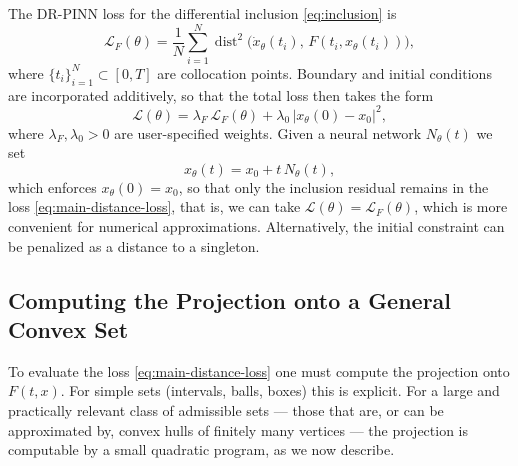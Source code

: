 \documentclass[11pt]{elsarticle}
\theoremstyle{definition}
\theoremstyle{remark}
\numberwithin{equation}{section}
\def\dist{\operatorname{dist}}
\begin{document}
	The DR-PINN loss for the differential inclusion \eqref{eq:inclusion} is
	\begin{equation}\label{eq:main-distance-loss}
		\mathcal{L}_F(\theta)
		=
		\frac{1}{N}\sum_{i=1}^{N}
		\dist^2\bigl(\dot{x}_\theta(t_i),\,F(t_i,x_\theta(t_i))\bigr),
	\end{equation}
	where $\{t_i\}_{i=1}^N\subset[0,T]$ are collocation points.  Boundary
	and initial conditions are incorporated additively, so that
	the total loss then takes the form
	\[
	\mathcal{L}(\theta)
	=
	\lambda_F\,\mathcal{L}_F(\theta)
	+
	\lambda_0\,|x_\theta(0)-x_0|^2,
	\]
	where $\lambda_F,\lambda_0>0$ are user-specified weights.
	Given a neural network $N_\theta(t)$ we set
	\[
	x_\theta(t)=x_0+t\,N_\theta(t),
	\]
	which enforces $x_\theta(0)=x_0$, so that only the inclusion residual
	remains in the loss \eqref{eq:main-distance-loss}, that is, we can take
	$\mathcal{L}(\theta) = \mathcal{L}_F(\theta)$,
	which is more convenient for numerical approximations.
	Alternatively, the
	initial constraint can be penalized as a distance to a singleton.
	
	
	
	\subsection{Computing the Projection onto a General Convex Set}
	\label{sec:projection-extreme-points}
	
	To evaluate the loss \eqref{eq:main-distance-loss} one must compute
	the projection onto $F(t,x)$.  For simple sets
	(intervals, balls, boxes) this is explicit.  For a large and practically
	relevant class of admissible sets --- those that are, or can be
	approximated by, convex hulls of finitely many vertices --- the
	projection is computable by a small quadratic program, as we now
	describe.
	
\end{document}
